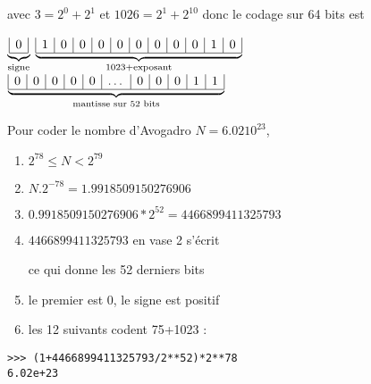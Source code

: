 avec $3 = 2^0+2^1$ et $1026 = 2^1 + 2^{10}$ donc le codage sur 64 bits est 
\begin{center}
$\underbrace{\begin{array}[t]{|l|}
0 \\ 
\hline 
\end{array}}_{\text{signe}}$
$\underbrace{\begin{array}[t]{|l|l|l|l|l|l|l|l|l|l|l|}
1&0&0&0&0&0&0&0&0&1&0 \\ 
\hline 
\end{array}}_{\text{1023+exposant}}$
$\underbrace{\begin{array}[t]{|l|l|l|l|l|l|l|l|l|l|l|}
0&0&0&0&0&\dots&0&0&0&1&1 \\ 
\hline 
\end{array}}_{\text{mantisse sur 52 bits}}$\\
\end{center}
Pour coder le nombre d'Avogadro $N = 6.02 10^{23}$, 
\begin{enumerate}
    \item $2^{78} \le N < 2^{79}$
    \item $N.2^{-78} = 1.9918509150276906$
    \item $0.9918509150276906*2^{52} = 4466899411325793$ 
    \item $4466899411325793$ en vase 2 s'écrit
     

     ce qui donne les 52 derniers bits
     \item le premier est 0, le signe est positif
     \item les 12 suivants codent 75+1023 : 
\end{enumerate}
\begin{lstlisting}
>>> (1+4466899411325793/2**52)*2**78
6.02e+23
\end{lstlisting}
\medskip

